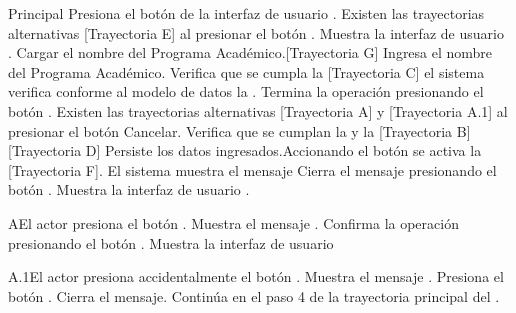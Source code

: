 \begin{UCtrayectoria}{Principal}
    \UCpaso[\UCactor] Presiona el botón  de la interfaz de usuario . Existen las trayectorias alternativas [Trayectoria E] al presionar el botón .
    \UCpaso Muestra la interfaz de usuario .
    \UCpaso Cargar el nombre del Programa Académico.[Trayectoria G]
    \UCpaso[\UCactor] Ingresa el nombre del Programa Académico. Verifica que se cumpla la [Trayectoria C] el sistema verifica conforme al modelo de datos la .
    \UCpaso[\UCactor] Termina la operación presionando el botón . Existen las trayectorias alternativas [Trayectoria A] y [Trayectoria A.1] al presionar el botón Cancelar.
    \UCpaso Verifica que se cumplan la  y la  [Trayectoria B][Trayectoria D]
    \UCpaso Persiste los datos ingresados.Accionando el botón  se activa la  [Trayectoria F].
    \UCpaso El sistema muestra el mensaje 
    \UCpaso[\UCactor] Cierra el mensaje presionando el botón .
    \UCpaso Muestra la interfaz de usuario .
\end{UCtrayectoria}


\begin{UCtrayectoriaA}{A}{El actor presiona el botón .}
    \UCpaso Muestra el mensaje .
    \UCpaso[\UCactor] Confirma la operación presionando el botón .
    \UCpaso Muestra la interfaz de usuario 
\end{UCtrayectoriaA}


\begin{UCtrayectoriaA}{A.1}{El actor presiona accidentalmente el botón .}
    \UCpaso Muestra el mensaje .
    \UCpaso[\UCactor] Presiona el botón .
    \UCpaso Cierra el mensaje.
    \UCpaso Continúa en el paso 4 de la trayectoria principal del .
\end{UCtrayectoriaA}

